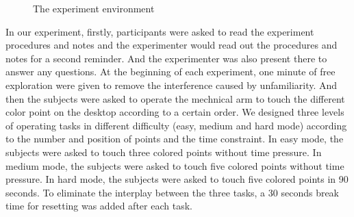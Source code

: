 \documentclass[runningheads,a4paper]{llncs}
\begin{document}
\begin{figure}
  \centering
  \hspace{0.5in}

  \hspace{0.5in}
  \caption{The experiment environment}
  \label{fig:experiment} %
\end{figure}

In our experiment, firstly, participants were asked to read the experiment
procedures and notes and the experimenter would read out the procedures and notes
for a second reminder. And the experimenter was also present there to answer any questions.
At the beginning of each experiment,
one minute of free exploration were given to remove the interference caused by unfamiliarity.
And then the subjects were asked to operate the mechnical arm to touch
the different color point on the desktop according to a certain order.
We designed three levels of operating tasks in different difficulty (easy, medium and hard mode)
according to the number and position of points and the time constraint. In easy
mode, the subjects were asked to touch three colored points without time pressure.
In medium mode, the subjects were asked to touch five colored points without
time pressure. In hard mode, the subjects were asked to touch five colored points
in 90 seconds. To eliminate the interplay between the three tasks,
a 30 seconds break time for resetting was added after each task.
\end{document}
